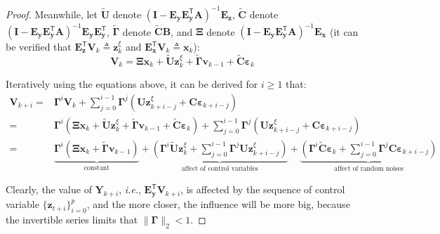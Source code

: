 \documentclass{article}
\theoremstyle{plain}
\theoremstyle{definition}
\theoremstyle{remark}
\def \ie {\textit{i.e.}}
\def \x {\mathbf{x}}
\def \E {\mathbf{E}}
\def \V {\mathbf{V}}
\def \Y {\mathbf{Y}}
\def \I {\mathbf{I}}
\def \U {\mathbf{U}}
\def \A {\mathbf{A}}
\def \V {\mathbf{V}}
\def \B {\mathbf{B}}
\def \C {\mathbf{C}}
\def \v {\mathbf{v}}
\def \y {\mathbf{y}}
\def \z {\mathbf{z}}
\begin{document}
\begin{proof}
Meanwhile, let \(\tilde{\U}\) denote \(\left(\I-\E_\y\E_\y^\mathsf{T}\A\right)^{-1}\E_\z\), \(\tilde{\C}\) denote \(\left(\I-\E_\y\E_\y^\mathsf{T}\A\right)^{-1} \E_\y\E_\y^\mathsf{T}\), \(\tilde{\bm{\Gamma}}\) denote \(\tilde{\C}\B\), and \(\bm{\Xi}\) denote \(\left(\I-\E_\y\E_\y^\mathsf{T} \A\right)^{-1}\E_\x\) (it can be verified that \(\E_\z^\mathsf{T}\V_{k}\triangleq \z_{k}^\xi\) and \(\E_\x^\mathsf{T}\V_{k}\triangleq \x_{k}\)):
 \begin{equation}
  \label{eq:vk}
  \V_{k} = \bm{\Xi}\x_k + \tilde{\U} \z_k^\xi +  \tilde{\bm{\Gamma}}\v_{k-1} + \tilde{\C} \bm{\varepsilon}_k
 \end{equation}

Iteratively using the equations above, it can be derived for \(i\geq 1\) that:
\[
\begin{aligned}
  \V_{k+i} =& \bm{\Gamma}^{i}\V_{k} + \sum_{j=0}^{i-1}\bm{\Gamma}^{j} \left(\U\z^\xi_{k+i-j}+\C\bm{\varepsilon}_{k+i-j}\right)\\
  =& \bm{\Gamma}^{i}\left(\bm{\Xi}\x_k + \tilde{\U} \z_k^\xi + \tilde{\bm{\Gamma}}\v_{k-1} + \tilde{\C} \bm{\varepsilon}_k\right) + \sum_{j=0}^{i-1}\bm{\Gamma}^{j} \left(\U\z^\xi_{k+i-j}+\C\bm{\varepsilon}_{k+i-j}\right)\\
  =& \underbrace{ \bm{\Gamma}^{i}\left(\bm{\Xi}\x_k + \tilde{\bm{\Gamma}}\v_{k-1}\right)}_{\text{constant}} + \underbrace{\left(\bm{\Gamma}^{i}\tilde{\U} \z_k^\xi + \sum_{j=0}^{i-1}\bm{\Gamma}^{j}\U\z^\xi_{k+i-j}\right)}_{\text{affect of control variables}} + \underbrace{\left(\bm{\Gamma}^{i}\tilde{\C} \bm{\varepsilon}_k + \sum_{j=0}^{i-1}\bm{\Gamma}^{j} \C\bm{\varepsilon}_{k+i-j}\right)}_{\text{affect of random noises}}
\end{aligned}
\]



Clearly, the value of \(\Y_{k+i}\), \ie, \(\E_\y^\mathsf{T}\V_{k+i}\), is affected by the sequence of control variable \(\{\z_{t+i}\}_{i=0}^p\), and the more closer, the influence will be more big, because the invertible series limits that \(\|\bm{\Gamma}\|_2<1\). 


\end{proof}
\end{document}
